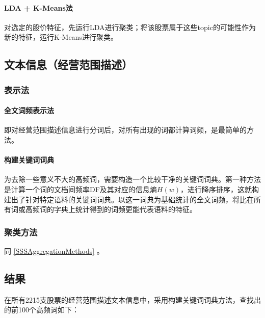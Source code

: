 \documentclass[12pt]{article}
\begin{document}
\paragraph{LDA + K-Means法}
对选定的股价特征，先运行LDA进行聚类；将该股票属于这些topic的可能性作为新的特征，运行K-Means进行聚类。

\subsection{文本信息（经营范围描述）}
\subsubsection{表示法}
\paragraph{全文词频表示法}
即对经营范围描述信息进行分词后，对所有出现的词都计算词频，是最简单的方法。

\paragraph{构建关键词词典}
为去除一些意义不大的高频词，需要构造一个比较干净的关键词词典。第一种方法是计算一个词的文档间频率DF及其对应的信息熵$H(w)$，进行降序排序，这就构建出了针对特定语料的关键词词典。以这一词典为基础统计的全文词频，将比在所有词或高频词的字典上统计得到的词频更能代表语料的特征。

\subsubsection{聚类方法}
同 \ref{SSSAggregationMethods} 。

\subsection{结果}
在所有2215支股票的经营范围描述文本信息中，采用构建关键词词典方法，查找出的前100个高频词如下：
\end{document}
